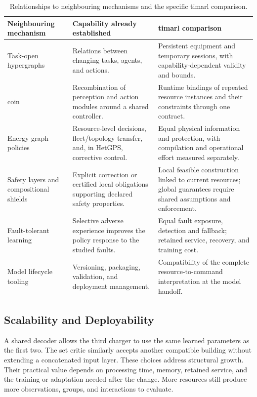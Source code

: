 \begin{table}[htbp]
\centering
\small
\caption{Relationships to neighbouring mechanisms and the specific \gls{timarl} comparison.}
\label{tab:timarl-progression}
\begin{tabularx}{\textwidth}{@{}p{}p{}X@{}}
\toprule
\textbf{Neighbouring mechanism} & \textbf{Capability already established} & \textbf{\gls{timarl} comparison}\\
\midrule
Task-open hypergraphs & Relations between changing tasks, agents, and actions. & Persistent equipment and temporary sessions, with capability-dependent validity and bounds.\\
\addlinespace
\gls{coin} & Recombination of perception and action modules around a shared controller. & Runtime bindings of repeated resource instances and their constraints through one contract.\\
\addlinespace
Energy graph policies & Resource-level decisions, fleet/topology transfer, and, in HetGPS, corrective control. & Equal physical information and protection, with compilation and operational effort measured separately.\\
\addlinespace
Safety layers and compositional shields & Explicit correction or certified local obligations supporting declared safety properties. & Local feasible construction linked to current resources; global guarantees require shared assumptions and enforcement.\\
\addlinespace
Fault-tolerant learning & Selective adverse experience improves the policy response to the studied faults. & Equal fault exposure, detection and fallback; retained service, recovery, and training cost.\\
\addlinespace
Model lifecycle tooling & Versioning, packaging, validation, and deployment management. & Compatibility of the complete resource-to-command interpretation at the model handoff.\\
\bottomrule
\end{tabularx}
\end{table}

\subsection{Scalability and Deployability}

A shared decoder allows the third charger to use the same learned parameters as the first two. The set critic similarly accepts another compatible building without extending a concatenated input layer. These choices address structural growth. Their practical value depends on processing time, memory, retained service, and the training or adaptation needed after the change. More resources still produce more observations, groups, and interactions to evaluate.

